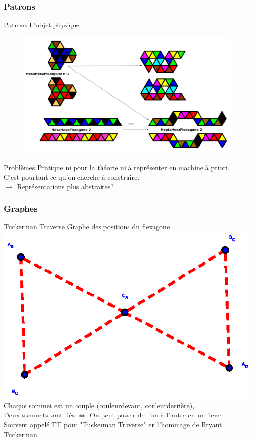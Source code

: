\documentclass[french,xcolor=dvipsnames]{beamer}
\begin{document}
		\subsubsection{Patrons}
		\begin{frame}{Patrons}
			L'objet physique
			\begin{figure}
				\includegraphics[scale=0.19]{exemples_patrons.png}
			\end{figure}
		\end{frame}

		\begin{frame}{Problèmes}
			Pratique ni pour la théorie ni à représenter en machine à priori.\\
			C'est pourtant ce qu'on cherche à construire.\\
			$\longrightarrow$ Représentations plus abstraites?
		\end{frame}
				
		\subsubsection{Graphes}
		\begin{frame}{Tuckerman Traverse}
			Graphe des positions du flexagone
			\includegraphics[scale=0.6]{TT_graphe_4.eps}\\
			Chaque sommet est un couple (couleurdevant, couleurderrière),\\
			Deux sommets sont liés $\Leftrightarrow$ On peut passer de l'un à l'autre en un flexe.\\
			Souvent appelé TT pour "Tuckerman Traverse" en l'hommage de Bryant Tuckerman.
		\end{frame}		
		
\end{document}
